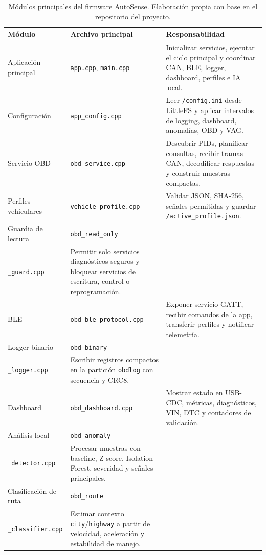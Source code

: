 \documentclass[12pt,letterpaper]{report}
\begin{document}
\begin{table}[!htbp]
\centering
\caption{Módulos principales del firmware AutoSense. Elaboración propia con base en el repositorio del proyecto.}
\label{tab:firmware-modulos}
\renewcommand{\arraystretch}{1.08}
\setlength{\tabcolsep}{4pt}
\scriptsize
\begin{tabular}{@{}p{}p{}p{}@{}}
\toprule
Módulo & Archivo principal & Responsabilidad \\
\midrule
Aplicación principal & \texttt{app.cpp}, \texttt{main.cpp} & Inicializar servicios, ejecutar el ciclo principal y coordinar CAN, BLE, logger, dashboard, perfiles e IA local. \\
Configuración & \texttt{app\_config.cpp} & Leer \texttt{/config.ini} desde LittleFS y aplicar intervalos de logging, dashboard, anomalías, OBD y VAG. \\
Servicio OBD & \texttt{obd\_service.cpp} & Descubrir PIDs, planificar consultas, recibir tramas CAN, decodificar respuestas y construir muestras compactas. \\
Perfiles vehiculares & \texttt{vehicle\_profile.cpp} & Validar JSON, SHA-256, señales permitidas y guardar \texttt{/active\_profile.json}. \\
Guardia de lectura & \texttt{obd\_read\_only}\\\texttt{\_guard.cpp} & Permitir solo servicios diagnósticos seguros y bloquear servicios de escritura, control o reprogramación. \\
BLE & \texttt{obd\_ble\_protocol.cpp} & Exponer servicio GATT, recibir comandos de la app, transferir perfiles y notificar telemetría. \\
Logger binario & \texttt{obd\_binary}\\\texttt{\_logger.cpp} & Escribir registros compactos en la partición \texttt{obdlog} con secuencia y CRC8. \\
Dashboard & \texttt{obd\_dashboard.cpp} & Mostrar estado en USB-CDC, métricas, diagnósticos, VIN, DTC y contadores de validación. \\
Análisis local & \texttt{obd\_anomaly}\\\texttt{\_detector.cpp} & Procesar muestras con baseline, Z-score, Isolation Forest, severidad y señales principales. \\
Clasificación de ruta & \texttt{obd\_route}\\\texttt{\_classifier.cpp} & Estimar contexto \texttt{city}/\texttt{highway} a partir de velocidad, aceleración y estabilidad de manejo. \\
\bottomrule
\end{tabular}
\end{table}
\end{document}
